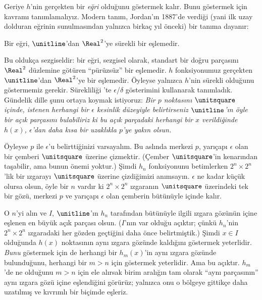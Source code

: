 Geriye $h$'nin gerçekten bir \emph{eğri} olduğunu göstermek kalır. Bunu
göstermek için kavramı tanımlamalıyız. Modern tanım, Jordan'ın 1887'de verdiği
(yani ilk uzay dolduran eğrinin sunulmasından yalnızca birkaç yıl önceki) bir
tanıma dayanır:

\begin{defn}
Bir eğri, $\unitline$'dan $\Real^2$'ye sürekli bir eşlemedir.
\end{defn}

Bu oldukça sezgiseldir: bir eğri, sezgisel olarak, standart bir doğru
parçasını $\Real^2$ düzlemine götüren ``pürüzsüz'' bir eşlemedir. $h$
fonksiyonumuz gerçekten $\unitline$'dan $\Real^2$'ye bir eşlemedir. Öyleyse
yalnızca $h$'nin sürekli olduğunu göstermemiz gerekir. Sürekliliği
'te $\epsilon$/$\delta$ gösterimini kullanarak tanımladık.
Gündelik dille şunu ortaya koymak istiyoruz: \emph{Bir $p$ noktasını
$\unitsquare$ içinde, istenen herhangi bir $\epsilon$ kesinlik düzeyiyle
belirtirseniz $\unitline$'ın öyle bir açık parçasını bulabiliriz ki bu açık
parçadaki herhangi bir $x$ verildiğinde $h(x)$, $\epsilon$'dan daha kısa bir
uzaklıkla $p$'ye yakın olsun.
}

Öyleyse $p$ ile $\epsilon$'u belirttiğinizi varsayalım. Bu aslında merkezi
$p$, yarıçapı $\epsilon$ olan bir çemberi $\unitsquare$ üzerine çizmektir.
(Çember $\unitsquare$'in kenarından taşabilir, ama bunun önemi yoktur.) Şimdi
$h_n$ fonksiyonunu betimlerken $2^n \times 2^n$'lik bir ızgarayı
$\unitsquare$ üzerine çizdiğimizi anımsayın. $\epsilon$ ne kadar küçük olursa
olsun, öyle bir $n$ vardır ki $2^n \times 2^n$ ızgaranın $\unitsquare$
üzerindeki tek bir gözü, merkezi $p$ ve yarıçapı $\epsilon$ olan çemberin
bütünüyle içinde kalır.

O $n$'yi alın ve $I$, $\unitline$'ın $h_n$ tarafından bütünüyle ilgili ızgara
gözünün içine eşlenen en büyük açık parçası olsun. ($I$'nın var olduğu
açıktır; çünkü $h_n$'nin $2^n\times 2^n$ ızgaradaki her gözden geçtiğini daha
önce belirtmiştik.) Şimdi $x \in I$ olduğunda $h(x)$ noktasının aynı ızgara
gözünde kaldığını göstermek yeterlidir. \emph{Bunu} göstermek için de herhangi bir
$h_m(x)$'in aynı ızgara gözünde bulunduğunu, herhangi bir $m > n$ için
göstermek yeterlidir. Ama bu açıktır. $h_m$'de ne olduğunu $m > n$ için ele
alırsak birim aralığın
tam olarak ``aynı parçasının'' aynı ızgara gözü içine eşlendiğini görürüz;
yalnızca onu o bölgeye gittikçe daha uzatılmış ve kıvrımlı bir biçimde
eşleriz.

